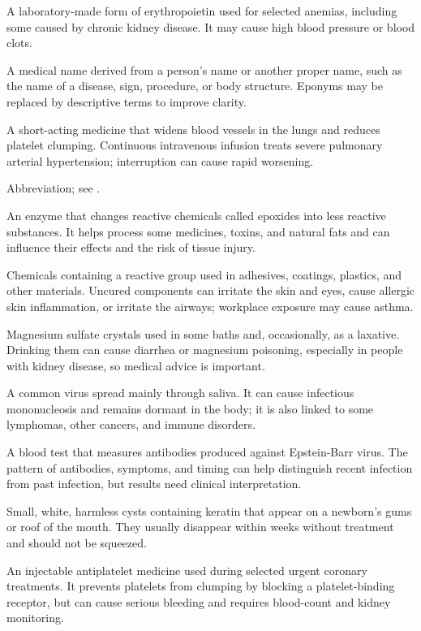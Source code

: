  A laboratory-made form of erythropoietin used for selected anemias, including some caused by chronic kidney disease. It may cause high blood pressure or blood clots.

 A medical name derived from a person’s name or another proper name, such as the name of a disease, sign, procedure, or body structure. Eponyms may be replaced by descriptive terms to improve clarity.

 A short-acting medicine that widens blood vessels in the lungs and reduces platelet clumping. Continuous intravenous infusion treats severe pulmonary arterial hypertension; interruption can cause rapid worsening.

 Abbreviation; see .

 An enzyme that changes reactive chemicals called epoxides into less reactive substances. It helps process some medicines, toxins, and natural fats and can influence their effects and the risk of tissue injury.

 Chemicals containing a reactive group used in adhesives, coatings, plastics, and other materials. Uncured components can irritate the skin and eyes, cause allergic skin inflammation, or irritate the airways; workplace exposure may cause asthma.

 Magnesium sulfate crystals used in some baths and, occasionally, as a laxative. Drinking them can cause diarrhea or magnesium poisoning, especially in people with kidney disease, so medical advice is important.

 A common virus spread mainly through saliva. It can cause infectious mononucleosis and remains dormant in the body; it is also linked to some lymphomas, other cancers, and immune disorders.

 A blood test that measures antibodies produced against Epstein-Barr virus. The pattern of antibodies, symptoms, and timing can help distinguish recent infection from past infection, but results need clinical interpretation.

 Small, white, harmless cysts containing keratin that appear on a newborn’s gums or roof of the mouth. They usually disappear within weeks without treatment and should not be squeezed.

 An injectable antiplatelet medicine used during selected urgent coronary treatments. It prevents platelets from clumping by blocking a platelet-binding receptor, but can cause serious bleeding and requires blood-count and kidney monitoring.

